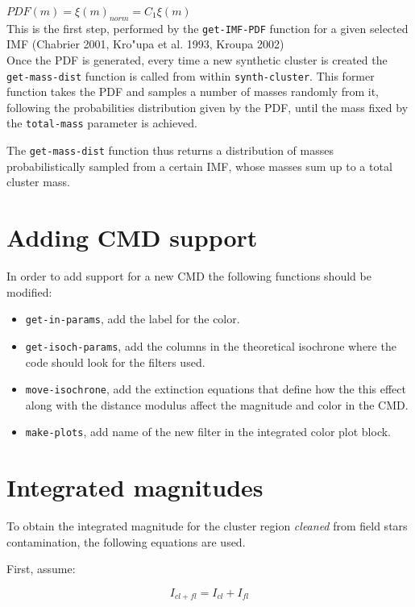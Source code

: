 \documentclass[10pt]{article}
\begin{document}
$PDF(m) = \xi(m)_{norm} = C_1 \xi(m) $\\

This is the first step, performed by the \texttt{get-IMF-PDF} function for a given selected
IMF (Chabrier 2001, Kro"upa et al. 1993, Kroupa 2002)\\


Once the PDF is generated, every time a new synthetic cluster is created the
\texttt{get-mass-dist} function is called from within \texttt{synth-cluster}. This
former function takes the PDF and samples a number of masses randomly from it, following
the probabilities distribution given by the PDF, until the mass fixed by the
\texttt{total-mass} parameter is achieved.

The \texttt{get-mass-dist} function thus returns a distribution of masses probabilistically
sampled from a certain IMF, whose masses sum up to a total cluster mass.


\section{Adding CMD support}

In order to add support for a new CMD the following functions should be modified:
\begin{itemize}
\item \texttt{get-in-params}, add the label for the color.
\item \texttt{get-isoch-params}, add the columns in the theoretical isochrone
where the code should look for the filters used.
\item \texttt{move-isochrone}, add the extinction equations that define how
the this effect along with the distance modulus affect the magnitude and color
in the CMD.
\item \texttt{make-plots}, add name of the new filter in the integrated color
plot block.
\end{itemize}

\section{Integrated magnitudes}

To obtain the integrated magnitude for the cluster region \textit{cleaned}
from field stars contamination, the following equations are used.

First, assume:

\begin{equation}
I_{cl+fl} = I_{cl} + I_{fl}
\label{eq:integ-cl-fl}
\end{equation}
\end{document}
